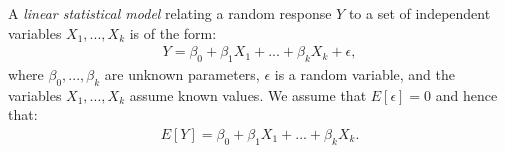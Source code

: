     \begin{definition}
        A \textit{linear statistical model} relating a random response $Y$ to a set of independent variables $X_1,...,X_k$ is of the form:
            \begin{equation*}
            \begin{split}
                Y = \beta_0 + \beta_1 X_1 + ... + \beta_k X_k + \epsilon,
            \end{split}
            \end{equation*}
        where $\beta_0,...,\beta_k$ are unknown parameters, $\epsilon$ is a random variable, and the variables $X_1,...,X_k$ assume known values. We assume that $E[\epsilon] = 0$ and hence that:
            \begin{equation*}
            \begin{split}
                E[Y] = \beta_0 + \beta_1 X_1 + ... + \beta_k X_k.
            \end{split}
            \end{equation*}
    \end{definition}

